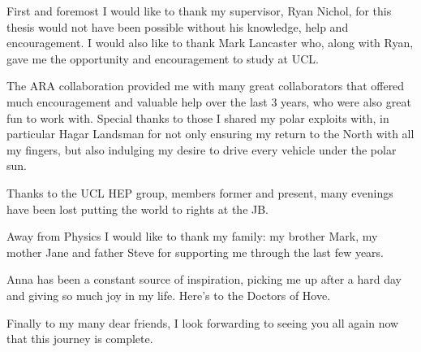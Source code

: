 First and foremost I would like to thank my supervisor, Ryan Nichol, for this thesis would not have been possible without his knowledge, help and encouragement. I would also like to thank Mark Lancaster who, along with Ryan, gave me the opportunity and encouragement to study at UCL.

The ARA collaboration provided me with many great collaborators that offered much encouragement and valuable help over the last 3 years, who were also great fun to work with. Special thanks to those I shared my polar exploits with, in particular Hagar Landsman for not only ensuring my return to the North with all my fingers, but also indulging my desire to drive every vehicle under the polar sun. 

\noindent Thanks to the UCL HEP group, members former and present,  many evenings have been lost putting the world to rights at the JB.

\noindent Away from Physics I would like to thank my family: my brother Mark, my mother Jane and father Steve for supporting me through the last few years. 

\noindent Anna has been a constant source of inspiration, picking me up after a hard day and giving so much joy in my life. Here's to the Doctors of Hove.

\noindent Finally to my many dear friends, I look forwarding to seeing you all again now that this journey is complete.



